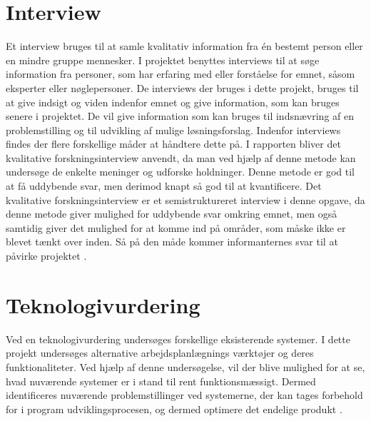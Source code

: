 \section{Interview}
Et interview bruges til at samle kvalitativ information fra én bestemt person eller en mindre gruppe mennesker. I projektet benyttes interviews til at søge information fra personer, som har erfaring med eller forståelse for emnet, såsom eksperter eller nøglepersoner. De interviews der bruges i dette projekt, bruges til at give indsigt og viden indenfor emnet og give information, som kan bruges senere i projektet. De vil give information som kan bruges til indsnævring af en problemstilling og til udvikling af mulige løsningsforslag.
Indenfor interviews findes der flere forskellige måder at håndtere dette på. I rapporten bliver det kvalitative forskningsinterview anvendt, da man ved hjælp af denne metode kan undersøge de enkelte meninger og udforske holdninger. Denne metode er god til at få uddybende svar, men derimod knapt så god til at kvantificere.
Det kvalitative forskningsinterview er et semistruktureret interview i denne opgave, da denne metode giver mulighed for uddybende svar omkring emnet, men også samtidig giver det mulighed for at komme ind på områder, som måske ikke er blevet tænkt over inden. Så på den måde kommer informanternes svar til at påvirke projektet \citep{BjarneHjorthAndersen, kvale2009}.

\section{Teknologivurdering}
Ved en teknologivurdering undersøges forskellige eksisterende systemer. I dette projekt undersøges alternative arbejdsplanlægnings værktøjer og deres funktionaliteter. Ved hjælp af denne undersøgelse, vil der blive mulighed for at se, hvad nuværende systemer er i stand til rent funktionsmæssigt. Dermed identificeres nuværende problemstillinger ved systemerne, der kan tages forbehold for i program udviklingsprocesen, og dermed optimere det endelige produkt \citep{PeterLarsen}.



